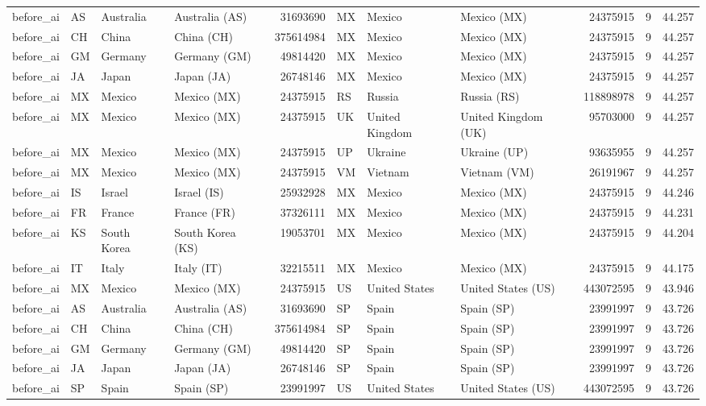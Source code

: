 \begin{tabular}{llllrlllrrr}
before\_ai & AS & Australia & Australia (AS) & 31693690 & MX & Mexico & Mexico (MX) & 24375915 & 9 & 44.257 \\
before\_ai & CH & China & China (CH) & 375614984 & MX & Mexico & Mexico (MX) & 24375915 & 9 & 44.257 \\
before\_ai & GM & Germany & Germany (GM) & 49814420 & MX & Mexico & Mexico (MX) & 24375915 & 9 & 44.257 \\
before\_ai & JA & Japan & Japan (JA) & 26748146 & MX & Mexico & Mexico (MX) & 24375915 & 9 & 44.257 \\
before\_ai & MX & Mexico & Mexico (MX) & 24375915 & RS & Russia & Russia (RS) & 118898978 & 9 & 44.257 \\
before\_ai & MX & Mexico & Mexico (MX) & 24375915 & UK & United Kingdom & United Kingdom (UK) & 95703000 & 9 & 44.257 \\
before\_ai & MX & Mexico & Mexico (MX) & 24375915 & UP & Ukraine & Ukraine (UP) & 93635955 & 9 & 44.257 \\
before\_ai & MX & Mexico & Mexico (MX) & 24375915 & VM & Vietnam & Vietnam (VM) & 26191967 & 9 & 44.257 \\
before\_ai & IS & Israel & Israel (IS) & 25932928 & MX & Mexico & Mexico (MX) & 24375915 & 9 & 44.246 \\
before\_ai & FR & France & France (FR) & 37326111 & MX & Mexico & Mexico (MX) & 24375915 & 9 & 44.231 \\
before\_ai & KS & South Korea & South Korea (KS) & 19053701 & MX & Mexico & Mexico (MX) & 24375915 & 9 & 44.204 \\
before\_ai & IT & Italy & Italy (IT) & 32215511 & MX & Mexico & Mexico (MX) & 24375915 & 9 & 44.175 \\
before\_ai & MX & Mexico & Mexico (MX) & 24375915 & US & United States & United States (US) & 443072595 & 9 & 43.946 \\
before\_ai & AS & Australia & Australia (AS) & 31693690 & SP & Spain & Spain (SP) & 23991997 & 9 & 43.726 \\
before\_ai & CH & China & China (CH) & 375614984 & SP & Spain & Spain (SP) & 23991997 & 9 & 43.726 \\
before\_ai & GM & Germany & Germany (GM) & 49814420 & SP & Spain & Spain (SP) & 23991997 & 9 & 43.726 \\
before\_ai & JA & Japan & Japan (JA) & 26748146 & SP & Spain & Spain (SP) & 23991997 & 9 & 43.726 \\
before\_ai & SP & Spain & Spain (SP) & 23991997 & US & United States & United States (US) & 443072595 & 9 & 43.726 \\

\end{tabular}
